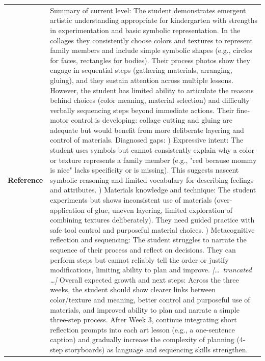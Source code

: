\begin{longtable}{@{}l p{12.5cm}@{}}
  \textbf{Reference} & Summary of current level: \newline The student demonstrates emergent artistic understanding appropriate for kindergarten with strengths in experimentation and basic symbolic representation. In the collages they consistently choose colors and textures to represent family members and include simple symbolic shapes (e.g., circles for faces, rectangles for bodies). Their process photos show they engage in sequential steps (gathering materials, arranging, gluing), and they sustain attention across multiple lessons. However, the student has limited ability to articulate the reasons behind choices (color meaning, material selection) and difficulty verbally sequencing steps beyond immediate actions. Their fine-motor control is developing: collage cutting and gluing are adequate but would benefit from more deliberate layering and control of materials. \newline Diagnosed gaps: \newline 1) Expressive intent: The student uses symbols but cannot consistently explain why a color or texture represents a family member (e.g., "red because mommy is nice" lacks specificity or is missing). This suggests nascent symbolic reasoning and limited vocabulary for describing feelings and attributes. \newline 2) Materials knowledge and technique: The student experiments but shows inconsistent use of materials (over-application of glue, uneven layering, limited exploration of combining textures deliberately). They need guided practice with safe tool control and purposeful material choices. \newline 3) Metacognitive reflection and sequencing: The student struggles to narrate the sequence of their process and reflect on decisions. They can perform steps but cannot reliably tell the order or justify modifications, limiting ability to plan and improve. \newline \textit{[\ldots\ truncated \ldots]} \newline Overall expected growth and next steps: \newline Across the three weeks, the student should show clearer links between color/texture and meaning, better control and purposeful use of materials, and improved ability to plan and narrate a simple three-step process. After Week 3, continue integrating short reflection prompts into each art lesson (e.g., a one-sentence caption) and gradually increase the complexity of planning (4-step storyboards) as language and sequencing skills strengthen. \\

\end{longtable}
